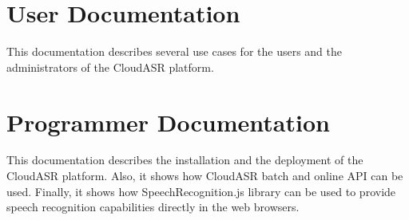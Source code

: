 \documentclass[12pt,a4paper]{report}
\let\openright=\clearpage
\begin{document}
\chapter{User Documentation}
This documentation describes several use cases for the users and the administrators of the CloudASR platform.


\chapter{Programmer Documentation}
This documentation describes the installation and the deployment of the CloudASR platform.
Also, it shows how CloudASR batch and online API can be used.
Finally, it shows how SpeechRecognition.js library can be used to provide speech recognition capabilities directly in the web browsers.




\openright
\end{document}
